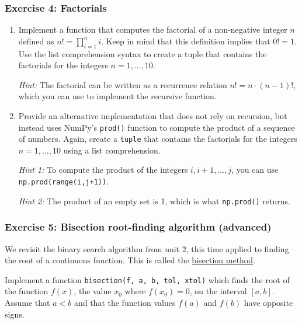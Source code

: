 \documentclass{scrartcl}
\begin{document}
    \hypertarget{exercise-4-factorials}{%
\subsubsection{Exercise 4: Factorials}\label{exercise-4-factorials}}

\begin{enumerate}
\def\labelenumi{\arabic{enumi}.}
\item
  Implement a function that computes the factorial of a non-negative
  integer \(n\) defined as \(n! = \prod_{i=1}^n i\). Keep in mind that
  this definition implies that \(0! = 1\). Use the list comprehension
  syntax to create a tuple that contains the factorials for the integers
  \(n=1,\dots,10\).

  \emph{Hint:} The factorial can be written as a recurrence relation
  \(n! = n \cdot (n-1)!\), which you can use to implement the recursive
  function.
\item
  Provide an alternative implementation that does not rely on recursion,
  but instead uses NumPy's \texttt{prod()} function to compute the
  product of a sequence of numbers. Again, create a \texttt{tuple} that
  contains the factorials for the integers \(n=1,\dots,10\) using a list
  comprehension.

  \emph{Hint 1:} To compute the product of the integers
  \(i,i+1,\dots,j\), you can use \texttt{np.prod(range(i,j+1))}.

  \emph{Hint 2:} The product of an empty set is 1, which is what
  \texttt{np.prod()} returns.
\end{enumerate}

    \hypertarget{exercise-5-bisection-root-finding-algorithm-advanced}{%
\subsubsection{Exercise 5: Bisection root-finding algorithm
(advanced)}\label{exercise-5-bisection-root-finding-algorithm-advanced}}

We revisit the binary search algorithm from unit 2, this time applied to
finding the root of a continuous function. This is called the
\href{https://en.wikipedia.org/wiki/Bisection_method}{bisection method}.

Implement a function \texttt{bisection(f,\ a,\ b,\ tol,\ xtol)} which
finds the root of the function \(f(x)\), \ie the value \(x_0\) where
\(f(x_0) = 0\), on the interval \([a,b]\). Assume that \(a<b\) and that
the function values \(f(a)\) and \(f(b)\) have opposite signs.
\end{document}
